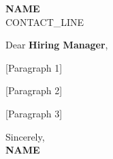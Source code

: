 \documentclass[letterpaper,11pt]{article}
\begin{document}
\begin{center}
    \textbf{\Huge \scshape {{NAME}}} \\ \vspace{1pt}
    \small {{CONTACT_LINE}}
\end{center}

\vspace{1 cm}

Dear \textbf{Hiring Manager},

\vspace{0.3cm}

[Paragraph 1]
\vspace{0.3cm}

[Paragraph 2]

\vspace{0.3cm}

[Paragraph 3]

\vspace{0.5cm}

Sincerely, \\[6pt]
\textbf{{{NAME}}}
\end{document}
